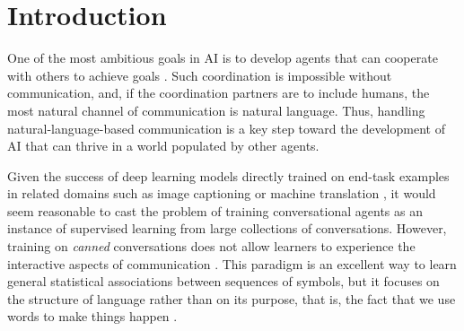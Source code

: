 \section{Introduction}


One of the most ambitious goals in AI is to develop agents that can cooperate with others to achieve goals \citep{wooldridge2009introduction}. Such coordination is impossible without communication, and, if the coordination partners are to include humans, the most natural channel of communication is natural language. Thus, handling natural-language-based communication is a key step toward the development of AI that can thrive in a world populated by other agents.

Given the success of deep learning models directly trained on end-task
examples in related domains such as image captioning or machine
translation \citep[e.g.,][]{Sutskever:etal:2014,Xu:etal:2015}, it
would seem reasonable to cast the problem of training conversational
agents as an instance of supervised learning from large collections of
conversations. However, training on \emph{canned} conversations does
not allow learners to experience the interactive aspects of
communication \citep{Vinyals:Le:2015}. This paradigm is an excellent
way to learn general statistical associations between sequences of
symbols, but it focuses on the structure of language rather than on
its purpose, that is, the fact that we use words to make things happen
\citep{Austin:1962,clark1996using}.

